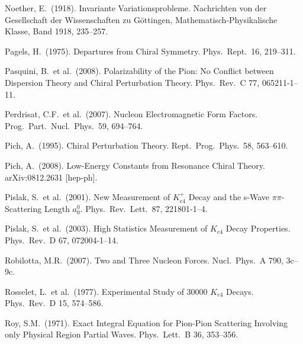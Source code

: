 \documentclass[twoside,12pt]{article}
\begin{document}
\begin{thebibliography}{}
Noether, E.~(1918).
Invariante Variationsprobleme.
Nachrichten von der Gesellschaft der Wissenschaften zu G\"ottingen, Mathematisch-Physikalische Klasse,
Band 1918, 235--257.

Pagels, H.~(1975).
Departures from Chiral Symmetry.
Phys.\ Rept.\ 16, 219--311.

Pasquini, B.~et al.~(2008).
Polarizability of the Pion: No Conflict between Dispersion Theory and
Chiral Perturbation Theory.
Phys.\ Rev.\  C 77, 065211-1--11.

Perdrisat, C.F.~et al.~(2007).
Nucleon Electromagnetic Form Factors.
Prog.\ Part.\ Nucl.\ Phys.\  59, 694--764.

Pich, A.~(1995).
Chiral Perturbation Theory.
Rept.\ Prog.\ Phys.\  58, 563--610.

Pich, A.~(2008).
Low-Energy Constants from Resonance Chiral Theory.
arXiv:0812.2631 [hep-ph].

Pislak, S.~et al.~(2001).
New Measurement of $K^+_{e4}$ Decay and the s-Wave $\pi\pi$-Scattering Length $a^0_0$.
Phys.\ Rev.\ Lett.\  87, 221801-1--4.

Pislak, S.~et al.~(2003).
High Statistics Measurement of $K_{e4}$ Decay Properties.
Phys.\ Rev.\  D 67, 072004-1--14.

Robilotta, M.R.~(2007).
Two and Three Nucleon Forces.
Nucl.\ Phys.\  A 790, 3c--9c.

Rosselet, L.~et al.~(1977).
Experimental Study of 30000 $K_{e4}$ Decays.
Phys.\ Rev.\  D 15, 574--586.

Roy, S.M.~(1971).
Exact Integral Equation for Pion-Pion Scattering Involving only Physical Region Partial Waves.
Phys.\ Lett.\  B 36, 353--356.


\end{thebibliography}
\end{document}
